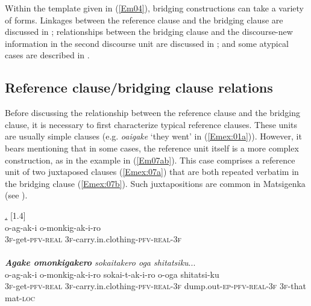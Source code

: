 \documentclass[output=paper]{LSP/langsci}
\begin{document}
%
Within the template given in (\ref{Em04}), bridging constructions can take a variety of forms. Linkages between the reference clause and the bridging clause are discussed in ; relationships between the bridging clause and the discourse-new information in the second discourse unit are discussed in ; and some atypical cases are described in .
%
\subsection{Reference clause/bridging clause relations}
\label{Emrelations}
Before discussing the relationship between the reference clause and the bridging clause, it is necessary to first characterize typical reference clauses. These units are usually simple clauses (e.g. \textit{oaigake} `they went' in (\ref{Emex:01a})). However, it bears mentioning that in some cases, the reference unit itself is a more complex construction, as in the example in (\ref{Em07ab}). This case comprises a reference unit of two juxtaposed clauses (\ref{Emex:07a}) that are both repeated verbatim in the bridging clause (\ref{Emex:07b}). Such juxtapositions are common in Matsigenka (see ).
 
\begin{exe}
\ex \label{Em07ab}
\begin{xlist}
\ex \label{Emex:07a}
\glt \textit{\underline{.}} [1.4]\\
\gll o-ag-ak-i o-monkig-ak-i-ro \\
 \textsc{3f-}get\textsc{-pfv-real} \textsc{3f-}carry.in.clothing\textsc{-pfv-real-3f}\\
\glt {}\\
\ex \label{Emex:07b}
\glt \textit{\textbf{Agake omonkigakero} sokaitakero oga shitatsiku}...\\
\gll o-ag-ak-i o-monkig-ak-i-ro sokai-t-ak-i-ro o-oga shitatsi-ku\\     	      
   \textsc{3f-}get\textsc{-pfv-real} \textsc{3f-}carry.in.clothing\textsc{-pfv-real-3f} dump.out\textsc{-ep-pfv-real-3f} \textsc{3f-}that mat\textsc{-loc}\\
\glt {}
\end{xlist}
\end{exe}
\end{document}

